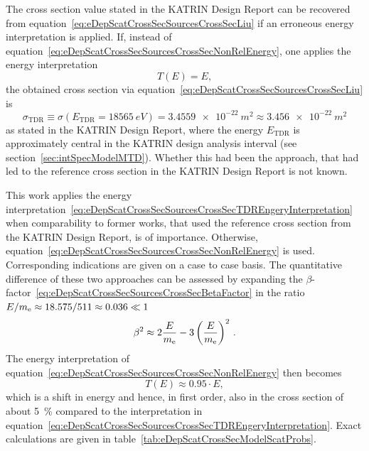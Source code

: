 The cross section value stated in the KATRIN Design Report can be recovered from equation~\eqref{eq:eDepScatCrossSecSourcesCrossSecLiu} if an erroneous energy interpretation is applied. If, instead of equation~\eqref{eq:eDepScatCrossSecSourcesCrossSecNonRelEnergy}, one applies the energy interpretation
\begin{equation}
	\label{eq:eDepScatCrossSecSourcesCrossSecTDREngeryInterpretation}
	T(E) = E
	\comma
\end{equation}
the obtained cross section via equation~\eqref{eq:eDepScatCrossSecSourcesCrossSecLiu} is
\begin{equation}
\label{eq:eDepScatCrossSecSourcesTRDCrossSec}
	\sigma_\mathrm{TDR} 
	\equiv\sigma(E_\mathrm{TDR}=\SI{18565}{eV})
	=\SI{3.4559e-22}{m^2} 
	\approx\SI{3.456e-22}{m^2}
\end{equation}
as stated in the KATRIN Design Report, where the energy $E_\mathrm{TDR}$ is approximately central in the KATRIN design analysis interval (see section~\ref{sec:intSpecModelMTD}). Whether this had been the approach, that had led to the reference cross section in the KATRIN Design Report is not known. 

This work applies the energy interpretation~\eqref{eq:eDepScatCrossSecSourcesCrossSecTDREngeryInterpretation} when comparability to former works, that used the reference cross section from the KATRIN Design Report, is of importance. Otherwise, equation~\eqref{eq:eDepScatCrossSecSourcesCrossSecNonRelEnergy} is used. Corresponding indications are given on a case to case basis. The quantitative difference of these two approaches can be assessed by expanding the $\beta$-factor~\eqref{eq:eDepScatCrossSecSourcesCrossSecBetaFactor} in the ratio $E/m_{\mathrm{e}} \approx 18.575/511 \approx 0.036 \ll 1$
\begin{equation}
	\beta^2 \approx 
	2 \frac{E}{m_{\mathrm{e}}} - 
	3 \left(\frac{E}{m_{\mathrm{e}}}\right)^2
	\text{\,.}
\end{equation}
The energy interpretation of equation~\eqref{eq:eDepScatCrossSecSourcesCrossSecNonRelEnergy} then becomes
\begin{equation}
	T(E) \approx 0.95 \cdot E
	\comma
\end{equation}
which is a shift in energy and hence, in first order, also in the cross section of about \SI{5}{\percent} compared to the interpretation in equation~\eqref{eq:eDepScatCrossSecSourcesCrossSecTDREngeryInterpretation}. Exact calculations are given in table~\ref{tab:eDepScatCrossSecModelScatProbs}.

